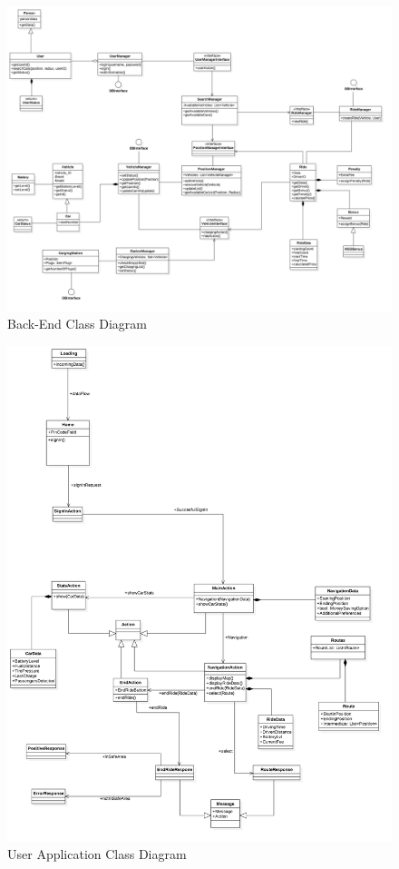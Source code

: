 \FloatBarrier
\clearpage
\FloatBarrier
\begin{figure}
\includegraphics[scale=0.4]{Images/ClassDiagram/BackEnd.png}
\caption{Back-End Class Diagram}
\end{figure}
\FloatBarrier
\FloatBarrier
\begin{figure}
\hspace{-15mm}
\includegraphics[scale=0.35]{Images/ClassDiagram/User.png}
\caption{User Application Class Diagram}
\end{figure}
